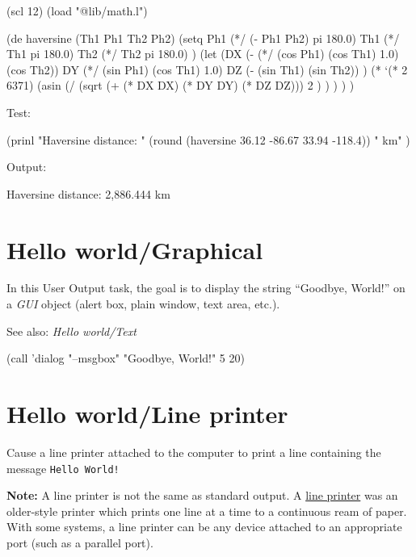 \begin{wideverbatim}

(scl 12)
(load "@lib/math.l")

(de haversine (Th1 Ph1 Th2 Ph2)
   (setq
      Ph1 (*/ (- Ph1 Ph2) pi 180.0)
      Th1 (*/ Th1 pi 180.0)
      Th2 (*/ Th2 pi 180.0) )
   (let
      (DX (- (*/ (cos Ph1) (cos Th1) 1.0) (cos Th2))
         DY (*/ (sin Ph1) (cos Th1) 1.0)
         DZ (- (sin Th1) (sin Th2)) )
      (* `(* 2 6371)
         (asin
            (/
               (sqrt (+ (* DX DX) (* DY DY) (* DZ DZ)))
               2 ) ) ) ) )

Test:

(prinl
   "Haversine distance: "
   (round (haversine 36.12 -86.67 33.94 -118.4))
   " km" )

Output:

Haversine distance: 2,886.444 km

\end{wideverbatim}

\pagebreak{}
\section*{Hello world/Graphical}

In this User Output task, the goal is to display the string ``Goodbye,
World!'' on a \emph{GUI} object (alert box, plain window, text area,
etc.).

See also: \emph{Hello world/Text}

\begin{wideverbatim}

(call 'dialog "--msgbox" "Goodbye, World!" 5 20)

\end{wideverbatim}

\pagebreak{}
\section*{Hello world/Line printer}

Cause a line printer attached to the computer to print a line containing
the message \texttt{Hello World!}

\textbf{Note:} A line printer is not the same as standard output. A
\href{http://en.wikipedia.org/wiki/line\_printer}{line printer} was an
older-style printer which prints one line at a time to a continuous ream
of paper. With some systems, a line printer can be any device attached
to an appropriate port (such as a parallel port).

